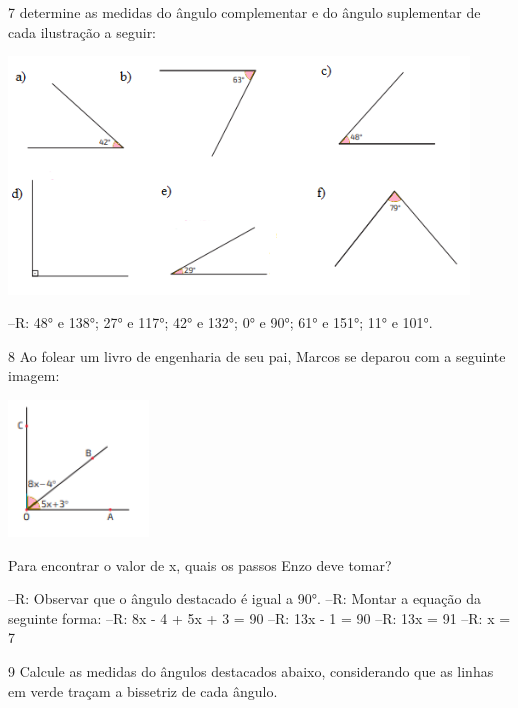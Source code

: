 {

\num{7} determine as medidas do ângulo complementar e do ângulo suplementar
de cada ilustração a seguir:

\includegraphics[width=4.81667in,height=2.48373in]{./imgSAEB_8_MAT/media/image30.png}

--R: 48° e 138°; 27° e 117°; 42° e 132°; 0° e 90°; 61° e 151°; 11° e 101°.

\num{8} Ao folear um livro de engenharia de seu pai, Marcos se deparou com a
seguinte imagem:

\includegraphics[width=1.47134in,height=1.42708in]{./imgSAEB_8_MAT/media/image31.png}

Para encontrar o valor de x, quais os passos Enzo deve tomar?

--R: Observar que o ângulo destacado é igual a 90°.
--R: Montar a equação da seguinte forma:
--R: 8x - 4 + 5x + 3 = 90
--R: 13x - 1 = 90
--R: 13x = 91
--R: x = 7

\num{9} Calcule as medidas do ângulos destacados abaixo, considerando que as
linhas em verde traçam a bissetriz de cada ângulo.

}
